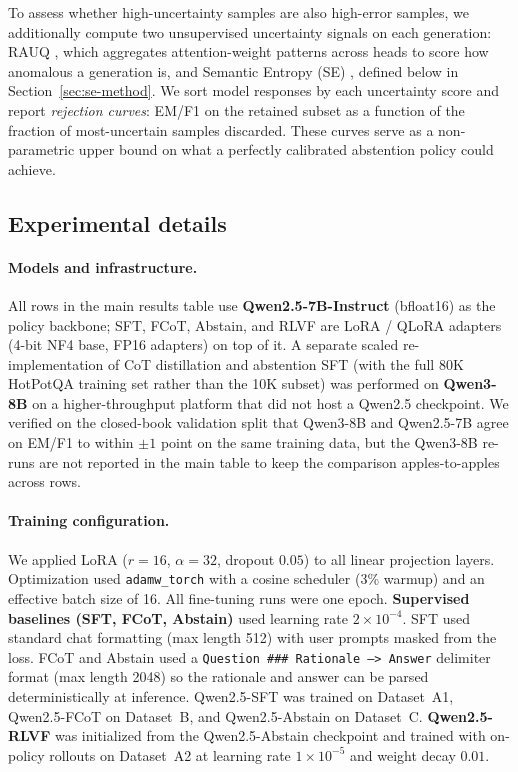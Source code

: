 \documentclass[11pt]{article}
\begin{document}
To assess whether high-uncertainty samples are also high-error samples, we additionally compute two unsupervised uncertainty signals on each generation: RAUQ \cite{vazhentsev2025rauq}, which aggregates attention-weight patterns across heads to score how anomalous a generation is, and Semantic Entropy (SE) \cite{Farquhar2024Detecting}, defined below in Section~\ref{sec:se-method}. We sort model responses by each uncertainty score and report \emph{rejection curves}: EM/F1 on the retained subset as a function of the fraction of most-uncertain samples discarded. These curves serve as a non-parametric upper bound on what a perfectly calibrated abstention policy could achieve.

\subsection{Experimental details}

\paragraph{Models and infrastructure.}
All rows in the main results table use \textbf{Qwen2.5-7B-Instruct} (bfloat16) as the policy backbone; SFT, FCoT, Abstain, and RLVF are LoRA / QLoRA adapters (4-bit NF4 base, FP16 adapters) on top of it. A separate scaled re-implementation of CoT distillation and abstention SFT (with the full 80K HotPotQA training set rather than the 10K subset) was performed on \textbf{Qwen3-8B} on a higher-throughput platform that did not host a Qwen2.5 checkpoint. We verified on the closed-book validation split that Qwen3-8B and Qwen2.5-7B agree on EM/F1 to within $\pm 1$ point on the same training data, but the Qwen3-8B re-runs are not reported in the main table to keep the comparison apples-to-apples across rows.

\paragraph{Training configuration.}
We applied LoRA ($r=16$, $\alpha=32$, dropout $0.05$) to all linear projection layers. Optimization used \texttt{adamw\_torch} with a cosine scheduler (3\% warmup) and an effective batch size of 16. All fine-tuning runs were one epoch. \textbf{Supervised baselines (SFT, FCoT, Abstain)} used learning rate $2{\times}10^{-4}$. SFT used standard chat formatting (max length 512) with user prompts masked from the loss. FCoT and Abstain used a \texttt{Question \#\#\# Rationale --> Answer} delimiter format (max length 2048) so the rationale and answer can be parsed deterministically at inference. Qwen2.5-SFT was trained on Dataset~A1, Qwen2.5-FCoT on Dataset~B, and Qwen2.5-Abstain on Dataset~C. \textbf{Qwen2.5-RLVF} was initialized from the Qwen2.5-Abstain checkpoint and trained with on-policy rollouts on Dataset~A2 at learning rate $1{\times}10^{-5}$ and weight decay $0.01$.
\end{document}
